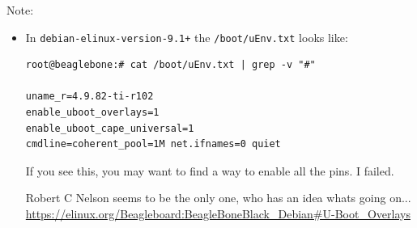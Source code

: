 \documentclass[
	fontsize=10pt
	paper=a4
]{scrartcl}
\begin{document}
Note:
\begin{footnotesize}
\begin{itemize}
\item In \texttt{debian-elinux-version-9.1+} the \texttt{/boot/uEnv.txt} looks like:
\begin{lstlisting}
root@beaglebone:# cat /boot/uEnv.txt | grep -v "#"

uname_r=4.9.82-ti-r102
enable_uboot_overlays=1
enable_uboot_cape_universal=1
cmdline=coherent_pool=1M net.ifnames=0 quiet
\end{lstlisting}

If you see this, you may want to find a way to enable all the pins. I failed.

Robert C Nelson seems to be the only one, who has an idea whats going on...
\url{https://elinux.org/Beagleboard:BeagleBoneBlack_Debian#U-Boot_Overlays}

\end{itemize}
\end{footnotesize}
\end{document}
